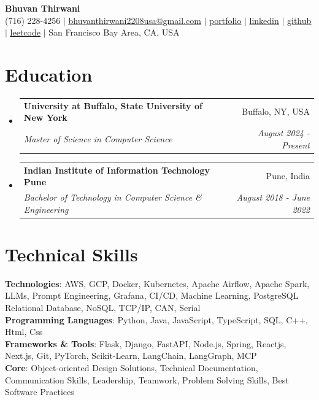 \documentclass[letterpaper,10pt]{report}
\makeatletter
\newcommand{\resumeEducationSubheading}[4]{
  \vspace{-2pt}\item
    \begin{tabular*}{0.97\textwidth}[t]{l@{\extracolsep{\fill}}r}
      \textbf{#1} & #2 \\
      \textit{\small#3} & \textit{\small #4} \\
    \end{tabular*}\vspace{-7pt}
}
\newcommand{\resumeSubHeadingListStart}{\begin{itemize}[leftmargin=0.15in, label={}]}
\newcommand{\resumeSubHeadingListEnd}{\end{itemize}}
\makeatother
\begin{document}
\vspace{-50pt}
\begin{center}

    \textbf{\Huge Bhuvan Thirwani} \\ \vspace{1pt}
    (716) 228-4256 $|$ \href{mailto:bhuvanthirwani2208usa@gmail.com}{\underline{bhuvanthirwani2208usa@gmail.com}} $|$
    \href{http://portfolio.haxcodes.dev}
    {\underline{portfolio}} $|$
    \href{http://www.linkedin.com/in/dev-hax-codes}
    {\underline{linkedin}} $|$
    \href{https://github.com/bhuvanthirwani}
    {\underline{github}} $|$
    \href{http://www.leetcode.com/bhuvanthirwani}
    {\underline{leetcode}} $|$
    {San Francisco Bay Area, CA, USA}
\end{center}

\section{Education}
  \resumeSubHeadingListStart
   \resumeEducationSubheading
      {University at Buffalo, State University of New York}{Buffalo, NY, USA}
      {Master of Science in Computer Science}{August 2024 - Present}
    \resumeEducationSubheading
      {Indian Institute of Information Technology Pune}{Pune, India}
      {Bachelor of Technology in Computer Science \& Engineering}{August 2018 - June 2022}
  \resumeSubHeadingListEnd

\section{Technical Skills}
 \begin{itemize}[leftmargin=0.05in, label={}]
    \small{
        \item{
     \textbf{Technologies}{: AWS, GCP, Docker, Kubernetes, Apache Airflow, Apache Spark, LLMs, Prompt Engineering, Grafana, CI/CD, Machine Learning, PostgreSQL Relational Database, NoSQL, TCP/IP, CAN, Serial} \\
\textbf{Programming Languages}{: Python, Java, JavaScript, TypeScript, SQL, C++, Html, Css} \\
     \textbf{Frameworks \& Tools}{: Flask, Django, FastAPI, Node.js, Spring, Reactjs, Next.js, Git, PyTorch, Scikit-Learn, LangChain, LangGraph, MCP} \\
     \textbf{Core}{: Object-oriented Design Solutions, Technical Documentation, Communication Skills, Leadership, Teamwork, Problem Solving Skills, Best Software Practices}
    }
    }
 
 \end{itemize}
\end{document}
